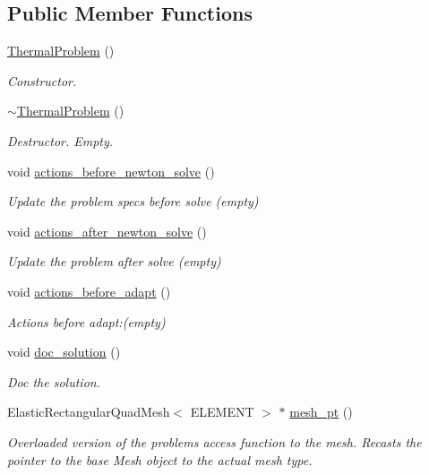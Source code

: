 \subsection*{Public Member Functions}
\begin{DoxyCompactItemize}
\item 
\hyperlink{classThermalProblem_a12ad5d383929b1ef4ed29503c5a271b0}{Thermal\+Problem} ()
\begin{DoxyCompactList}\small\item\em Constructor. \end{DoxyCompactList}\item 
\hyperlink{classThermalProblem_af563f946765bdae233c202738bf7e725}{$\sim$\+Thermal\+Problem} ()
\begin{DoxyCompactList}\small\item\em Destructor. Empty. \end{DoxyCompactList}\item 
void \hyperlink{classThermalProblem_ab2d2efaf155756144c9796b76af3ee8d}{actions\+\_\+before\+\_\+newton\+\_\+solve} ()
\begin{DoxyCompactList}\small\item\em Update the problem specs before solve (empty) \end{DoxyCompactList}\item 
void \hyperlink{classThermalProblem_ad38edfd46e049fdbc5b00bafb661f8e2}{actions\+\_\+after\+\_\+newton\+\_\+solve} ()
\begin{DoxyCompactList}\small\item\em Update the problem after solve (empty) \end{DoxyCompactList}\item 
void \hyperlink{classThermalProblem_a40bda0a4d45851f7e45dc461107d7c0f}{actions\+\_\+before\+\_\+adapt} ()
\begin{DoxyCompactList}\small\item\em Actions before adapt\+:(empty) \end{DoxyCompactList}\item 
void \hyperlink{classThermalProblem_aa085f248542811385fefe623a9193fd8}{doc\+\_\+solution} ()
\begin{DoxyCompactList}\small\item\em Doc the solution. \end{DoxyCompactList}\item 
Elastic\+Rectangular\+Quad\+Mesh$<$ E\+L\+E\+M\+E\+NT $>$ $\ast$ \hyperlink{classThermalProblem_ac1ebc681e22c65c384aa63a7e9da6129}{mesh\+\_\+pt} ()
\begin{DoxyCompactList}\small\item\em Overloaded version of the problem\textquotesingle{}s access function to the mesh. Recasts the pointer to the base Mesh object to the actual mesh type. \end{DoxyCompactList}\end{DoxyCompactItemize}
